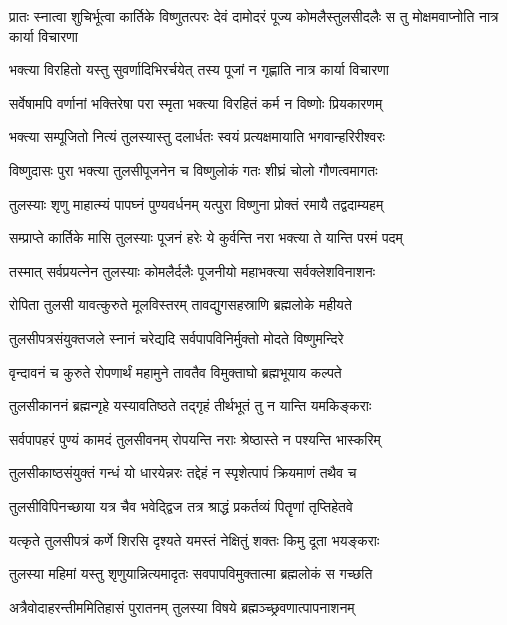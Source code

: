 \threelineshloka
{प्रातः स्नात्वा शुचिर्भूत्वा कार्तिके विष्णुतत्परः}
{देवं दामोदरं पूज्य कोमलैस्तुलसीदलैः}
{स तु मोक्षमवाप्नोति नात्र कार्या विचारणा} %

\twolineshloka
{भक्त्या विरहितो यस्तु सुवर्णादिभिरर्चयेत्}
{तस्य पूजां न गृह्णाति नात्र कार्या विचारणा} %

\twolineshloka
{सर्वेषामपि वर्णानां भक्तिरेषा परा स्मृता}
{भक्त्या विरहितं कर्म न विष्णोः प्रियकारणम्} %

\twolineshloka
{भक्त्या सम्पूजितो नित्यं तुलस्यास्तु दलार्धतः}
{स्वयं प्रत्यक्षमायाति भगवान्हरिरीश्वरः} %

\twolineshloka
{विष्णुदासः पुरा भक्त्या तुलसीपूजनेन च}
{विष्णुलोकं गतः शीघ्रं चोलो गौणत्वमागतः} %

\twolineshloka
{तुलस्याः शृणु माहात्म्यं पापघ्नं पुण्यवर्धनम्}
{यत्पुरा विष्णुना प्रोक्तं रमायै तद्वदाम्यहम्} %

\twolineshloka
{सम्प्राप्ते कार्तिके मासि तुलस्याः पूजनं हरेः}
{ये कुर्वन्ति नरा भक्त्या ते यान्ति परमं पदम्} %

\twolineshloka
{तस्मात् सर्वप्रयत्नेन तुलस्याः कोमलैर्दलैः}
{पूजनीयो महाभक्त्या सर्वक्लेशविनाशनः} %

\twolineshloka
{रोपिता तुलसी यावत्कुरुते मूलविस्तरम्}
{तावद्युगसहस्राणि ब्रह्मलोके महीयते} %

\twolineshloka
{तुलसीपत्रसंयुक्तजले स्नानं चरेद्यदि}
{सर्वपापविनिर्मुक्तो मोदते विष्णुमन्दिरे} %

\twolineshloka
{वृन्दावनं च कुरुते रोपणार्थं महामुने}
{तावतैव विमुक्ताघो ब्रह्मभूयाय कल्पते} %

\twolineshloka
{तुलसीकाननं ब्रह्मन्गृहे यस्यावतिष्ठते}
{तद्गृहं तीर्थभूतं तु न यान्ति यमकिङ्कराः} %

\twolineshloka
{सर्वपापहरं पुण्यं कामदं तुलसीवनम्}
{रोपयन्ति नराः श्रेष्ठास्ते न पश्यन्ति भास्करिम्} %

\twolineshloka
{तुलसीकाष्ठसंयुक्तं गन्धं यो धारयेन्नरः}
{तद्देहं न स्पृशेत्पापं क्रियमाणं तथैव च} %

\twolineshloka
{तुलसीविपिनच्छाया यत्र चैव भवेद्द्विज}
{तत्र श्राद्धं प्रकर्तव्यं पितॄणां तृप्तिहेतवे} %

\twolineshloka
{यत्कृते तुलसीपत्रं कर्णे शिरसि दृश्यते}
{यमस्तं नेक्षितुं शक्तः किमु दूता भयङ्कराः} %

\twolineshloka
{तुलस्या महिमां यस्तु शृणुयान्नित्यमादृतः}
{सवपापविमुक्तात्मा ब्रह्मलोकं स गच्छति} %

\twolineshloka
{अत्रैवोदाहरन्तीममितिहासं पुरातनम्}
{तुलस्या विषये ब्रह्मञ्च्छ्रवणात्पापनाशनम्} %


